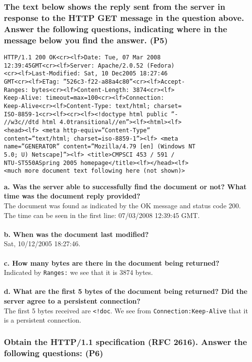 \subsubsection{The text below shows the reply sent from the server in response to the HTTP GET message in the question above. Answer the following questions, indicating where in the message below you find the answer. (P5)}

\begin{verbatim}
HTTP/1.1 200 OK<cr><lf>Date: Tue, 07 Mar 2008
12:39:45GMT<cr><lf>Server: Apache/2.0.52 (Fedora)
<cr><lf>Last-Modified: Sat, 10 Dec2005 18:27:46
GMT<cr><lf>ETag: ”526c3-f22-a88a4c80”<cr><lf>Accept-
Ranges: bytes<cr><lf>Content-Length: 3874<cr><lf>
Keep-Alive: timeout=max=100<cr><lf>Connection:
Keep-Alive<cr><lf>Content-Type: text/html; charset=
ISO-8859-1<cr><lf><cr><lf><!doctype html public ”-
//w3c//dtd html 4.0transitional//en”><lf><html><lf>
<head><lf> <meta http-equiv=”Content-Type”
content=”text/html; charset=iso-8859-1”><lf> <meta
name=”GENERATOR” content=”Mozilla/4.79 [en] (Windows NT
5.0; U) Netscape]”><lf> <title>CMPSCI 453 / 591 /
NTU-ST550ASpring 2005 homepage</title><lf></head><lf>
<much more document text following here (not shown)>
\end{verbatim}
\noindent
\textbf{a. Was the server able to successfully find the document or not? What time was the document reply provided?} \\
The document was found as indicated by the OK message and status code 200. The time can be seen in the first line: 07/03/2008 12:39:45 GMT. \\
\\
\textbf{b. When was the document last modified?} \\
Sat, 10/12/2005 18:27:46. \\
\\
\textbf{c. How many bytes are there in the document being returned?} \\
Indicated by \texttt{Ranges:} we see that it is 3874 bytes. \\
\\
\textbf{d. What are the first 5 bytes of the document being returned? Did the server agree to a persistent connection?} \\
The first 5 bytes received are \texttt{<!doc}. We see from \texttt{Connection:Keep-Alive} that it is a persistent connection.


\subsubsection{Obtain the HTTP/1.1 specification (RFC 2616). Answer the following
questions: (P6)}

